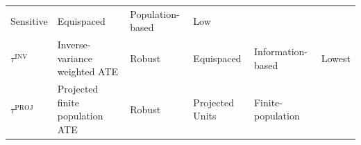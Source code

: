 \documentclass[letter]{article}
\newcommand{\invvar}{\tau^{\mathrm{INV}}}
\newcommand{\tauproj}{\tau^{\mathrm{PROJ}}}
\begin{document}
\begin{longtable}[]{@{}llllll@{}}
\begin{minipage}[t]{0.13\columnwidth}
Sensitive\strut
\end{minipage} & \begin{minipage}[t]{0.13\columnwidth}\raggedright\strut
Equispaced\strut
\end{minipage} & \begin{minipage}[t]{0.15\columnwidth}\raggedright\strut
Population-based\strut
\end{minipage} & \begin{minipage}[t]{0.08\columnwidth}\raggedright\strut
Low\strut
\end{minipage}\tabularnewline
\begin{minipage}[t]{0.09\columnwidth}\raggedright\strut
\(\invvar\)\strut
\end{minipage} & \begin{minipage}[t]{0.25\columnwidth}\raggedright\strut
Inverse-variance weighted ATE\strut
\end{minipage} & \begin{minipage}[t]{0.13\columnwidth}\raggedright\strut
Robust\strut
\end{minipage} & \begin{minipage}[t]{0.13\columnwidth}\raggedright\strut
Equispaced\strut
\end{minipage} & \begin{minipage}[t]{0.15\columnwidth}\raggedright\strut
Information-based\strut
\end{minipage} & \begin{minipage}[t]{0.08\columnwidth}\raggedright\strut
Lowest\strut
\end{minipage}\tabularnewline
\begin{minipage}[t]{0.09\columnwidth}\raggedright\strut
\(\tauproj\)\strut
\end{minipage} & \begin{minipage}[t]{0.25\columnwidth}\raggedright\strut
Projected finite population ATE\strut
\end{minipage} & \begin{minipage}[t]{0.13\columnwidth}\raggedright\strut
Robust\strut
\end{minipage} & \begin{minipage}[t]{0.13\columnwidth}\raggedright\strut
Projected Units\strut
\end{minipage} & \begin{minipage}[t]{0.15\columnwidth}\raggedright\strut
Finite-population\strut
\end{minipage} & \begin{minipage}[t]{0.08\columnwidth}\raggedright\strut

\end{minipage}
\end{longtable}
\end{document}
